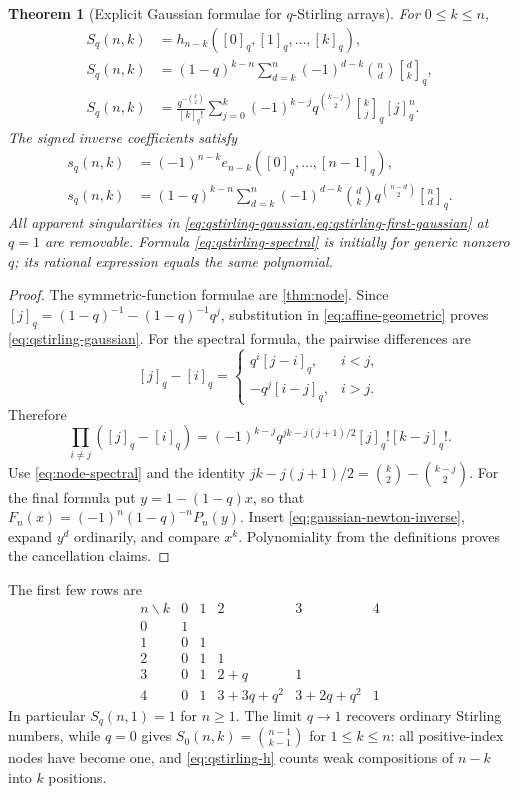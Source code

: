 \documentclass[11pt,a4paper]{article}
\numberwithin{equation}{section}
\newtheorem{theorem}{Theorem}[section]
\theoremstyle{definition}
\theoremstyle{remark}
\newcommand{\G}[2]{\genfrac{[}{]}{0pt}{}{#1}{#2}_{q}}
\newcommand{\qnum}[1]{[#1]_q}
\newcommand{\qfac}[1]{[#1]_q!}
\begin{document}
\begin{theorem}[Explicit Gaussian formulae for $q$-Stirling arrays]
\label{thm:qstirling}
For $0\le k\le n$,
\begin{align}
 S_q(n,k)&=h_{n-k}(\qnum0,\qnum1,\ldots,\qnum k),
 \label{eq:qstirling-h}\\
 S_q(n,k)&=(1-q)^{k-n}
       \sum_{d=k}^n(-1)^{d-k}\binom nd\G dk,
 \label{eq:qstirling-gaussian}\\
 S_q(n,k)&=\frac{q^{-\binom k2}}{\qfac k}
       \sum_{j=0}^k(-1)^{k-j}q^{\binom{k-j}2}\G kj\qnum j^n.
 \label{eq:qstirling-spectral}
\end{align}
The signed inverse coefficients satisfy
\begin{align}
 s_q(n,k)&=(-1)^{n-k}e_{n-k}(\qnum0,\ldots,\qnum{n-1}),
 \label{eq:qstirling-first}\\
 s_q(n,k)&=(1-q)^{k-n}
 \sum_{d=k}^n(-1)^{d-k}\binom dk
        q^{\binom{n-d}2}\G nd.
 \label{eq:qstirling-first-gaussian}
\end{align}
All apparent singularities in \cref{eq:qstirling-gaussian,eq:qstirling-first-gaussian}
at $q=1$ are removable. Formula \cref{eq:qstirling-spectral} is initially
for generic nonzero $q$; its rational expression equals the same polynomial.
\end{theorem}
\begin{proof}
The symmetric-function formulae are \cref{thm:node}.
Since $\qnum j=(1-q)^{-1}-(1-q)^{-1}q^j$, substitution in
\cref{eq:affine-geometric} proves \cref{eq:qstirling-gaussian}.
For the spectral formula, the pairwise differences are
\[
 \qnum j-\qnum i=
 \begin{cases}q^i\qnum{j-i},&i<j,\\-q^j\qnum{i-j},&i>j.
 \end{cases}
\]
Therefore
\[
 \prod_{i\ne j}(\qnum j-\qnum i)
 =(-1)^{k-j}q^{jk-j(j+1)/2}\qfac j\qfac{k-j}.
\]
Use \cref{eq:node-spectral} and the identity
$jk-j(j+1)/2=\binom k2-\binom{k-j}2$.
For the final formula put $y=1-(1-q)x$, so that
$F_n(x)=(-1)^n(1-q)^{-n}P_n(y)$. Insert
\cref{eq:gaussian-newton-inverse}, expand $y^d$ ordinarily, and compare
$x^k$. Polynomiality from the definitions proves the cancellation claims.
\end{proof}

The first few rows are
\begin{equation}
\begin{array}{c|lllll}
 n\backslash k&0&1&2&3&4\\\hline
 0&1\\
 1&0&1\\
 2&0&1&1\\
 3&0&1&2+q&1\\
 4&0&1&3+3q+q^2&3+2q+q^2&1
\end{array}
\label{eq:qstirling-table}
\end{equation}
In particular $S_q(n,1)=1$ for $n\ge1$. The limit $q\to1$ recovers
ordinary Stirling numbers, while $q=0$ gives
$S_0(n,k)=\binom{n-1}{k-1}$ for $1\le k\le n$: all positive-index
nodes have become one, and \cref{eq:qstirling-h} counts weak
compositions of $n-k$ into $k$ positions.
\end{document}
